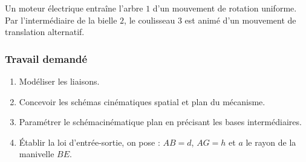 Un moteur électrique entraîne l'arbre $1$ d'un mouvement de rotation uniforme. Par l'intermédiaire de la bielle $2$, le coulisseau $3$ est animé d'un mouvement de translation alternatif.

\subsubsection{Travail demandé}
\begin{enumerate}
\item Modéliser les liaisons.
\item Concevoir les schémas cinématiques spatial et plan du mécanisme.
\item Paramétrer le schémacinématique plan en précisant les bases intermédiaires.
\item Établir la loi d'entrée-sortie, on pose : $AB=d$, $AG=h$ et $a$ le rayon de la manivelle $BE$.
\end{enumerate}

\newpage

